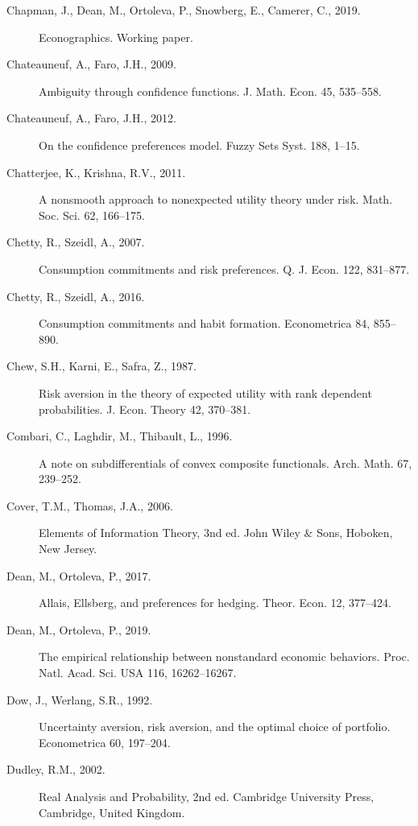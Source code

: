 \documentclass[12pt,a4paper]{article}
\newenvironment{original}
  {\par\noindent\color{black}\smallskip}
  {\par\smallskip}
\begin{document}
\begin{original}
\begin{description}
\item[Chapman, J., Dean, M., Ortoleva, P., Snowberg, E., Camerer, C., 2019.] Econographics. Working paper.

\item[Chateauneuf, A., Faro, J.H., 2009.] Ambiguity through confidence functions. J. Math. Econ. 45, 535--558.

\item[Chateauneuf, A., Faro, J.H., 2012.] On the confidence preferences model. Fuzzy Sets Syst. 188, 1--15.

\item[Chatterjee, K., Krishna, R.V., 2011.] A nonsmooth approach to nonexpected utility theory under risk. Math. Soc. Sci. 62, 166--175.

\item[Chetty, R., Szeidl, A., 2007.] Consumption commitments and risk preferences. Q. J. Econ. 122, 831--877.

\item[Chetty, R., Szeidl, A., 2016.] Consumption commitments and habit formation. Econometrica 84, 855--890.

\item[Chew, S.H., Karni, E., Safra, Z., 1987.] Risk aversion in the theory of expected utility with rank dependent probabilities. J. Econ. Theory 42, 370--381.

\item[Combari, C., Laghdir, M., Thibault, L., 1996.] A note on subdifferentials of convex composite functionals. Arch. Math. 67, 239--252.

\item[Cover, T.M., Thomas, J.A., 2006.] Elements of Information Theory, 3nd ed. John Wiley \& Sons, Hoboken, New Jersey.

\item[Dean, M., Ortoleva, P., 2017.] Allais, Ellsberg, and preferences for hedging. Theor. Econ. 12, 377--424.

\item[Dean, M., Ortoleva, P., 2019.] The empirical relationship between nonstandard economic behaviors. Proc. Natl. Acad. Sci. USA 116, 16262--16267.

\item[Dow, J., Werlang, S.R., 1992.] Uncertainty aversion, risk aversion, and the optimal choice of portfolio. Econometrica 60, 197--204.

\item[Dudley, R.M., 2002.] Real Analysis and Probability, 2nd ed. Cambridge University Press, Cambridge, United Kingdom.


\end{description}
\end{original}
\end{document}
